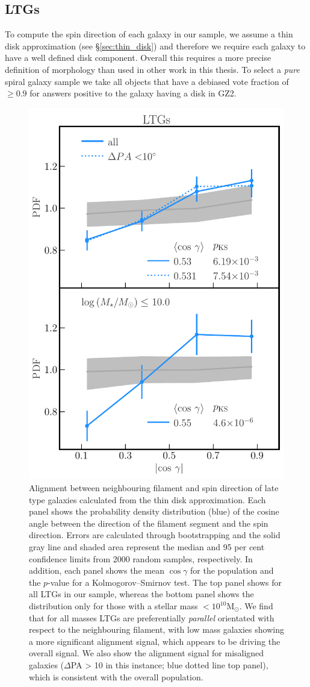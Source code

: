 \subsection{LTGs}
To compute the spin direction of each galaxy in our sample, we assume a thin disk approximation (see \S\ref{sec:thin_disk}) and therefore we require each galaxy to have a well defined disk component. Overall this requires a more precise definition of morphology than used in other work in this thesis. To select a \textit{pure} spiral galaxy sample we take all objects that have a debiased vote fraction of $\geq 0.9$ for answers positive to the galaxy having a disk in GZ2. 

\begin{figure}
    \centering
    \includegraphics[width=0.65\linewidth]{thesis/latex/cw_spin/spin_fil_LTGs_2in1.pdf}
    \caption{Alignment between neighbouring filament and spin direction of late type galaxies calculated from the thin disk approximation. Each panel shows the probability density distribution (blue) of the cosine angle between the direction of the filament segment and the spin direction. Errors are calculated through bootstrapping and the solid gray line and shaded area represent the median and 95 per cent confidence limits from 2000 random samples, respectively. In addition, each panel shows the mean $\cos \gamma$ for the population and the $p$-value for a Kolmogorov--Smirnov test. The top panel shows for all LTGs in our sample, whereas the bottom panel shows the distribution only for those with a stellar mass $\mathrm{< 10^{10} M_{\odot}}$. We find that for all masses LTGs are preferentially \textit{parallel} orientated with respect to the neighbouring filament, with low mass galaxies showing a more significant alignment signal, which appears to be driving the overall signal. We also show the alignment signal for misaligned galaxies ($\Delta$PA > 10 in this instance; blue dotted line top panel), which is consistent with the overall population.}
    \label{fig:ltgs_spin_alignment} 
\end{figure}

